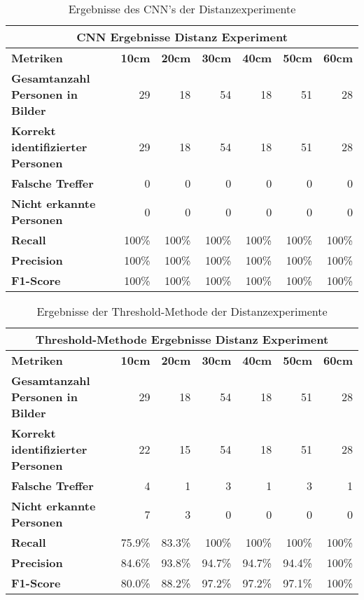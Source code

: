 {
	\renewcommand{\arraystretch}{1.3}
	\begin{table}[H]
		\centering
		\scriptsize
		\begin{tabularx}{.9\textwidth}{Xrrrrrr}
			\hline
			\multicolumn{7}{c}{\textbf{\gls{CNN} Ergebnisse Distanz Experiment}}\\
			\hline
			\textbf{Metriken} & \textbf{10cm} & \textbf{20cm} & \textbf{30cm} & \textbf{40cm} & \textbf{50cm} & \textbf{60cm}\\
			\hline 
			\textbf{Gesamtanzahl Personen in Bilder} & 29 & 18 & 54 & 18 & 51 & 28\\
			\hline
			\textbf{Korrekt identifizierter Personen} & 29 & 18 & 54 & 18 & 51 & 28\\
			\hline
			\textbf{Falsche Treffer} & 0 & 0 & 0 & 0 & 0 & 0\\
			\hline
			\textbf{Nicht erkannte Personen} & 0 & 0 & 0 & 0 & 0 & 0\\
			\hline
			\textbf{Recall} & 100\% & 100\% & 100\% & 100\% & 100\% & 100\%\\
			\hline  
			\textbf{Precision} & 100\% & 100\% & 100\% & 100\% & 100\% & 100\%\\
			\hline
			\textbf{F1-Score} & 100\% & 100\% & 100\% & 100\% & 100\% & 100\%\\
			\hline
		\end{tabularx}
		\caption{Ergebnisse des \gls{CNN}'s der Distanzexperimente}
		\label{tbl:distanceCNN}
	\end{table}
	\begin{table}[H]
		\centering
		\scriptsize
		\begin{tabularx}{.9\textwidth}{Xrrrrrr}
			\hline
			\multicolumn{7}{c}{\textbf{Threshold-Methode Ergebnisse Distanz Experiment}}\\
			\hline
			\textbf{Metriken} & \textbf{10cm} & \textbf{20cm} & \textbf{30cm} & \textbf{40cm} & \textbf{50cm} & \textbf{60cm}\\
			\hline 
			\textbf{Gesamtanzahl Personen in Bilder} & 29 & 18 & 54 & 18 & 51 & 28\\
			\hline
			\textbf{Korrekt identifizierter Personen} & 22 & 15 & 54 & 18 & 51 & 28\\
			\hline
			\textbf{Falsche Treffer} & 4 & 1 & 3 & 1 & 3 & 1\\
			\hline
			\textbf{Nicht erkannte Personen} & 7 & 3 & 0 & 0 & 0 & 0\\
			\hline
			\textbf{Recall} & 75.9\% & 83.3\% & 100\% & 100\% & 100\% & 100\%\\
			\hline  
			\textbf{Precision} & 84.6\% & 93.8\% & 94.7\% & 94.7\% & 94.4\% & 100\%\\
			\hline
			\textbf{F1-Score} & 80.0\% & 88.2\% & 97.2\% & 97.2\% & 97.1\% & 100\%\\
			\hline
		\end{tabularx}
		\caption{Ergebnisse der Threshold-Methode der Distanzexperimente}
		\label{tbl:distanceThresh}
	\end{table}
}

